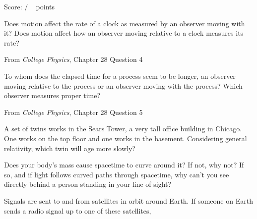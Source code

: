 \documentclass[addpoints,12pt]{exam}
\begin{document}
\clearpage

\begin{flushright}
Score: \hspace{0.2in} / \numpoints ~ points
\end{flushright}

\begin{questions}
\question[2] Does motion affect the rate of a clock as measured by an observer moving with it? Does motion affect how an observer moving relative to a clock
measures its rate?

From \textit{College Physics}, Chapter 28 Question 4
\vspace{1in}

\question[2] To whom does the elapsed time for a process seem to be longer, an observer moving relative to the process or an observer moving with the
process? Which observer measures proper time?

From \textit{College Physics}, Chapter 28 Question 5
\vspace{1in}

\question[2] A set of twins works in the Sears Tower, a very tall office building in Chicago. One works on the top floor and one works in the basement. Considering general relativity, which twin will age more slowly?
\vspace{1in}

\question[2] Does your body's mass cause spacetime to curve around it? If not, why not? If so, and if light follows curved paths through spacetime, why can't you see directly behind a person standing in your line of sight?
\vspace{1in}

\clearpage

\question[10]Signals are sent to and from satellites in orbit around Earth. If someone on Earth sends a radio signal up to one of these satellites,
\end{questions}
\end{document}
